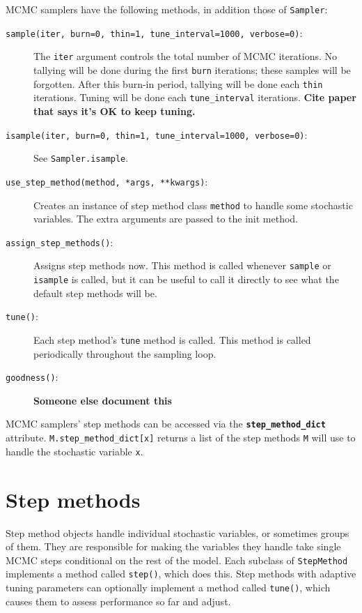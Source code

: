MCMC samplers have the following methods, in addition those of \texttt{Sampler}:
\begin{description}
    \item[\texttt{sample(iter, burn=0, thin=1, tune\_interval=1000, verbose=0)}:] The \texttt{iter} argument controls the total number of MCMC iterations. No tallying will be done during the first \texttt{burn} iterations; these samples will be forgotten. After this burn-in period, tallying will be done each \texttt{thin} iterations. Tuning will be done each \texttt{tune\_interval} iterations. \textbf{Cite paper that says it's OK to keep tuning.}
    \item[\texttt{isample(iter, burn=0, thin=1, tune\_interval=1000, verbose=0)}:] See \texttt{Sampler.isample}.
    \item[\texttt{use_step_method(method, *args, **kwargs)}:] Creates an instance of step method class \texttt{method} to handle some stochastic variables. The extra arguments are passed to the init method.
    \item[\texttt{assign_step_methods()}:] Assigns step methods now. This method is called whenever \texttt{sample} or \texttt{isample} is called, but it can be useful to call it directly to see what the default step methods will be.
    \item[\texttt{tune()}:] Each step method's \texttt{tune} method is called. This method is called periodically throughout the sampling loop.
    \item[\texttt{goodness()}:] \textbf{Someone else document this}
\end{description}

MCMC samplers' step methods can be accessed via the \texttt{\textbf{step_method_dict}} attribute. \texttt{M.step_method_dict[x]} returns a list of the step methods \texttt{M} will use to handle the stochastic variable \texttt{x}.

\section{Step methods} 
\label{sec:stepmethod} 

Step method objects handle individual stochastic variables, or sometimes groups of them. They are responsible for making the variables they handle take single MCMC steps conditional on the rest of the model. Each subclass of \texttt{StepMethod} implements a method called \texttt{step()}, which does this. Step methods with adaptive tuning parameters can optionally implement a method called \texttt{tune()}, which causes them to assess performance so far and adjust.


